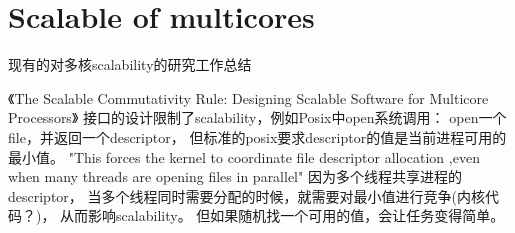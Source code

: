 \section{Scalable of multicores}
现有的对多核scalability的研究工作总结


《The Scalable Commutativity Rule: Designing Scalable Software for Multicore Processors》\cite{Clements2015SCR}
接口的设计限制了scalability，例如Posix中open系统调用：
open一个file，并返回一个descriptor，
但标准的posix要求descriptor的值是当前进程可用的最小值。
"This forces the kernel to coordinate file descriptor allocation
,even when many threads are opening files in parallel"
因为多个线程共享进程的descriptor，
当多个线程同时需要分配的时候，就需要对最小值进行竞争(内核代码？)，
从而影响scalability。
但如果随机找一个可用的值，会让任务变得简单。

